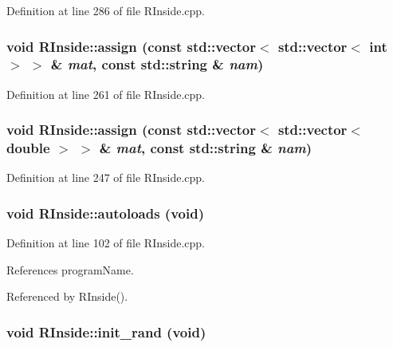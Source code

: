 Definition at line 286 of file RInside.cpp.\hypertarget{classRInside_abae6700c75661cfb635859ac3d3c50d1}{
\subsubsection[{assign}]{\setlength{\rightskip}{0pt plus 5cm}void RInside::assign (const std::vector$<$ std::vector$<$ int $>$ $>$ \& {\em mat}, \/  const std::string \& {\em nam})}}
\label{classRInside_abae6700c75661cfb635859ac3d3c50d1}


Definition at line 261 of file RInside.cpp.\hypertarget{classRInside_aedd5db3eb2bcc97a93914088d599c8b4}{
\subsubsection[{assign}]{\setlength{\rightskip}{0pt plus 5cm}void RInside::assign (const std::vector$<$ std::vector$<$ double $>$ $>$ \& {\em mat}, \/  const std::string \& {\em nam})}}
\label{classRInside_aedd5db3eb2bcc97a93914088d599c8b4}


Definition at line 247 of file RInside.cpp.\hypertarget{classRInside_a41c250f2ef249a02a0d32e761628d943}{
\subsubsection[{autoloads}]{\setlength{\rightskip}{0pt plus 5cm}void RInside::autoloads (void)}}
\label{classRInside_a41c250f2ef249a02a0d32e761628d943}


Definition at line 102 of file RInside.cpp.

References programName.

Referenced by RInside().\hypertarget{classRInside_af9920dd157552b7a5dce8573574ce78d}{
\subsubsection[{init\_\-rand}]{\setlength{\rightskip}{0pt plus 5cm}void RInside::init\_\-rand (void)}}
\label{classRInside_af9920dd157552b7a5dce8573574ce78d}


